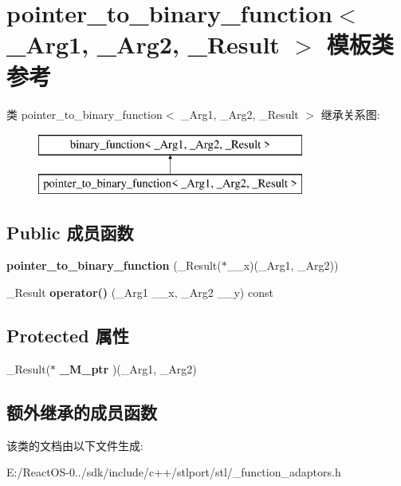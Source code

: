 \hypertarget{classpointer__to__binary__function}{}\section{pointer\+\_\+to\+\_\+binary\+\_\+function$<$ \+\_\+\+Arg1, \+\_\+\+Arg2, \+\_\+\+Result $>$ 模板类 参考}
\label{classpointer__to__binary__function}
类 pointer\+\_\+to\+\_\+binary\+\_\+function$<$ \+\_\+\+Arg1, \+\_\+\+Arg2, \+\_\+\+Result $>$ 继承关系图\+:\begin{figure}[H]
\begin{center}
\leavevmode
\includegraphics[height=2.000000cm]{classpointer__to__binary__function}
\end{center}
\end{figure}
\subsection*{Public 成员函数}
\begin{DoxyCompactItemize}
\item 
\mbox{\label{classpointer__to__binary__function_a8038f32be5b6a58438217f8988230734}} 
{\bfseries pointer\+\_\+to\+\_\+binary\+\_\+function} (\+\_\+\+Result($\ast$\+\_\+\+\_\+x)(\+\_\+\+Arg1, \+\_\+\+Arg2))
\item 
\mbox{\label{classpointer__to__binary__function_a5eb35ec836d3f9c307acb73f47484323}} 
\+\_\+\+Result {\bfseries operator()} (\+\_\+\+Arg1 \+\_\+\+\_\+x, \+\_\+\+Arg2 \+\_\+\+\_\+y) const
\end{DoxyCompactItemize}
\subsection*{Protected 属性}
\begin{DoxyCompactItemize}
\item 
\mbox{\label{classpointer__to__binary__function_aedd0851aed44fa1cf1275968e1617bbb}} 
\+\_\+\+Result($\ast$ {\bfseries \+\_\+\+M\+\_\+ptr} )(\+\_\+\+Arg1, \+\_\+\+Arg2)
\end{DoxyCompactItemize}
\subsection*{额外继承的成员函数}


该类的文档由以下文件生成\+:\begin{DoxyCompactItemize}
\item 
E\+:/\+React\+O\+S-\/0../sdk/include/c++/stlport/stl/\+\_\+function\+\_\+adaptors.\+h\end{DoxyCompactItemize}
